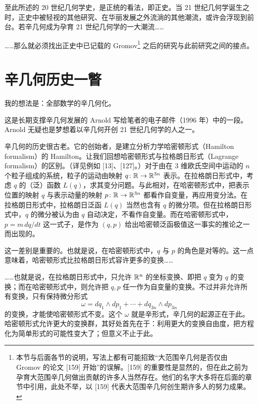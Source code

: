 至此所述的 20 世纪几何学史，是正统的看法，即正史。当 21 世纪几何学诞生之时，正史中被轻视的其他研究、在华丽发展之外流淌的其他潮流，或许会浮现到前台。若辛几何成为孕育 21 世纪几何学的一大潮流……

……那么就必须找出正史中已记载的 Gromov\footnote{本节与后面各节的说明，写法上都有可能招致“大范围辛几何是否仅由 Gromov 的论文 [159] 开始”的误解。[159] 的重要性是显然的，但在此之前为孕育大范围辛几何做出贡献的许多人当然存在。他们的名字大多将在后面的章节中引用，此处不举，以 [159] 代表大范围辛几何创生期许多人的努力成果。} 之后的研究与此前研究之间的接点。

\section{辛几何历史一瞥}

我的想法是：全部数学的辛几何化。

这是长期支撑辛几何发展的 Arnold 写给笔者的电子邮件（1996 年）中的一段。Arnold 无疑也是梦想着以辛几何开创 21 世纪几何学的人之一。


辛几何的历史很古老。它的创始者，是建立分析力学哈密顿形式（Hamilton formalism）的 Hamilton。让我们回想哈密顿形式与拉格朗日形式（Lagrange formalism）的区别。（详见例如 [13]、[127]。）对于由在 3 维欧氏空间中运动的 $n$ 个粒子组成的系统，粒子的运动由映射 $q\colon\mathbb{R}\to\mathbb{R}^{3n}$ 表示。在拉格朗日形式中，考虑 $q$ 的（泛）函数 $L(q)$，求其变分问题。与此相对，在哈密顿形式中，把表示位置的映射 $q$ 与表示动量的映射 $p\colon\mathbb{R}\to\mathbb{R}^{3n}$ 都看作自变量，再应用变分法。在拉格朗日形式中，拉格朗日泛函 $L(q)$ 当然也含有 $q$ 的微分项。但在拉格朗日形式中，$q$ 的微分被认为由 $q$ 自动决定，不看作自变量。而在哈密顿形式中，$p=m\,dq/dt$ 这一式子，是作为 $(q,p)$ 给出哈密顿泛函极值这一事实的推论之一而出现的。



这一差别是重要的。也就是说，在哈密顿形式中，$q$ 与 $p$ 的角色是对等的。这一点意味着，哈密顿形式比拉格朗日形式容许更多的变换……

……也就是说，在拉格朗日形式中，只允许 $\mathbb{R}^n$ 的坐标变换、即把 $q$ 变为 $q$ 的变换；而在哈密顿形式中，则允许把 $q,p$ 任一作为自变量的变换。不过并非允许所有变换，只有保持微分形式
\begin{equation}
  \omega=dq_1\wedge dp_1+\cdots+dq_{3n}\wedge dp_{3n} \tag{1.1}
\end{equation}
的变换，才能使哈密顿形式不变。这个 $\omega$ 就是辛形式，辛几何的起源正在于此。哈密顿形式允许更大的变换群，其好处首先在于：利用更大的变换自由度，把方程化为简单形式的可能性变大了；但意义不止于此。


